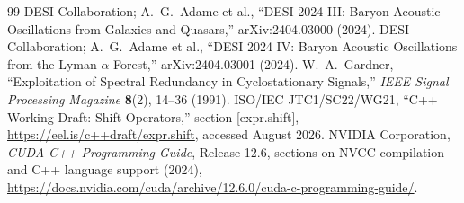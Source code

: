\begin{thebibliography}{99}
 DESI Collaboration; A.~G.~Adame et al., ``DESI 2024 III: Baryon Acoustic Oscillations from Galaxies and Quasars,'' arXiv:2404.03000 (2024).
 DESI Collaboration; A.~G.~Adame et al., ``DESI 2024 IV: Baryon Acoustic Oscillations from the Lyman-$\alpha$ Forest,'' arXiv:2404.03001 (2024).
 W.~A.~Gardner, ``Exploitation of Spectral Redundancy in Cyclostationary Signals,'' \emph{IEEE Signal Processing Magazine} \textbf{8}(2), 14--36 (1991).
 ISO/IEC JTC1/SC22/WG21, ``C++ Working Draft: Shift Operators,'' section [expr.shift], \url{https://eel.is/c++draft/expr.shift}, accessed August 2026.
 NVIDIA Corporation, \emph{CUDA C++ Programming Guide}, Release 12.6, sections on NVCC compilation and C++ language support (2024), \url{https://docs.nvidia.com/cuda/archive/12.6.0/cuda-c-programming-guide/}.
\end{thebibliography}
